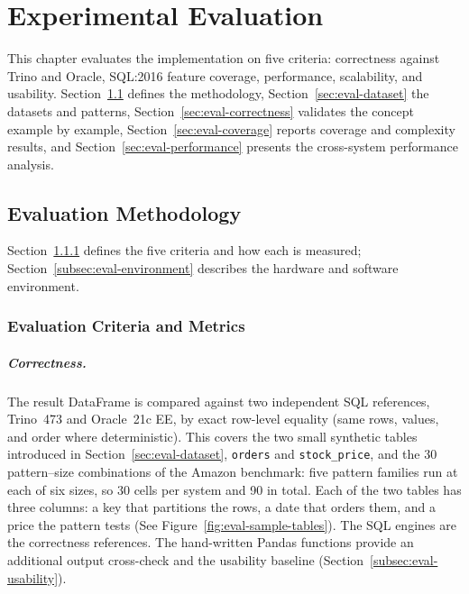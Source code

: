 \chapter{Experimental Evaluation}
\label{chap:evaluation}

This chapter evaluates the implementation on five criteria:
correctness against Trino and Oracle, SQL:2016 feature coverage,
performance, scalability, and usability.
Section~\ref{sec:eval-methodology} defines the methodology,
Section~\ref{sec:eval-dataset} the datasets and patterns,
Section~\ref{sec:eval-correctness} validates the concept example by
example, Section~\ref{sec:eval-coverage} reports coverage and
complexity results, and Section~\ref{sec:eval-performance} presents
the cross-system performance analysis.

\section{Evaluation Methodology}
\label{sec:eval-methodology}

Section~\ref{subsec:eval-metrics} defines the five criteria and how
each is measured; Section~\ref{subsec:eval-environment} describes the
hardware and software environment.

\subsection{Evaluation Criteria and Metrics}
\label{subsec:eval-metrics}

\paragraph{Correctness.}
The result DataFrame is compared against two independent SQL
references, Trino~473 and Oracle~21c EE, by exact row-level equality
(same rows, values, and order where deterministic).  This covers the
two small synthetic tables introduced in
Section~\ref{sec:eval-dataset}, \texttt{orders} and
\texttt{stock\_price}, and the 30 pattern--size combinations of the
Amazon benchmark: five pattern families run at each of six sizes, so
30 cells per system and 90 in total.  Each of the two tables has three
columns: a key that partitions the rows, a date that orders them, and a
price the pattern tests (See Figure~\ref{fig:eval-sample-tables}).  The SQL
engines are the
correctness references.  The hand-written Pandas functions provide an
additional output cross-check and the usability baseline
(Section~\ref{subsec:eval-usability}).

